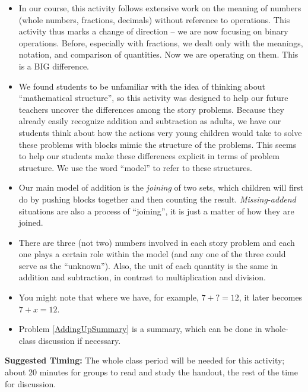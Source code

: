 \documentclass{ximera}
\begin{document}
\begin{instructorNotes}
\begin{itemize}
	\item In our course, this activity follows extensive work on the meaning of numbers (whole numbers, fractions, decimals) without reference to operations.  This activity thus marks a change of direction -- we are now focusing on binary operations. Before, especially with fractions, we dealt only with the meanings, notation, and comparison of quantities.  Now we are operating on them. This is a BIG difference.
	\item We found students to be unfamiliar with the idea of thinking about ``mathematical structure'', so this activity was designed to	help our future teachers uncover the differences among the story problems.  Because they already easily recognize addition and subtraction as adults, we have our students think about how the actions very young children would take to solve these problems with blocks mimic the structure of the problems. This seems to help our students make these differences explicit in terms of problem structure.  We use the word ``model'' to refer to these structures.
	\item Our main model of addition is the {\em joining} of two sets, which children will first do by pushing blocks together and then counting the result.  {\em Missing-addend} situations are also a process of ``joining'', it is just a matter of how they are joined.
	\item There are three (not two) numbers involved in each story problem and each one plays a certain role within the model (and any one of the three could serve as the ``unknown'').  Also, the unit of each quantity is the same in addition and subtraction, in contrast to multiplication and division.
	\item You might note that where we have, for example, $7 + ? = 12$, it later becomes $7 + x = 12$.
	\item Problem \ref{AddingUpSummary} is a summary, which can be done in whole-class discussion if necessary.
\end{itemize}

{\bf Suggested Timing:} The whole class period will be needed for this activity; about 20 minutes for groups to read and study the handout, the rest of the time for discussion. 
\end{instructorNotes}
\end{document}
